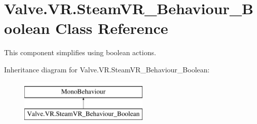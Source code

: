 \hypertarget{class_valve_1_1_v_r_1_1_steam_v_r___behaviour___boolean}{}\section{Valve.\+V\+R.\+Steam\+V\+R\+\_\+\+Behaviour\+\_\+\+Boolean Class Reference}
\label{class_valve_1_1_v_r_1_1_steam_v_r___behaviour___boolean}


This component simplifies using boolean actions.  


Inheritance diagram for Valve.\+V\+R.\+Steam\+V\+R\+\_\+\+Behaviour\+\_\+\+Boolean\+:\begin{figure}[H]
\begin{center}
\leavevmode
\includegraphics[height=2.000000cm]{class_valve_1_1_v_r_1_1_steam_v_r___behaviour___boolean}
\end{center}
\end{figure}
